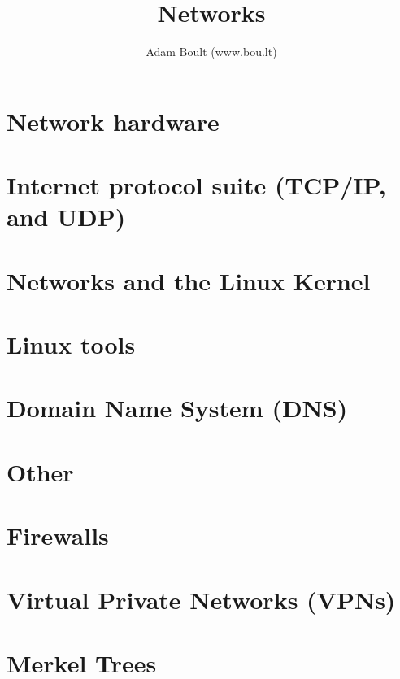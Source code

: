 \documentclass[oneside]{book}
\begin{document}
\author{Adam Boult (www.bou.lt)}
\title{Networks}
\maketitle

\setcounter{tocdepth}{0}
\tableofcontents



\part{Network hardware}

\part{Internet protocol suite (TCP/IP, and UDP)}


\part{Networks and the Linux Kernel}

\part{Linux tools}






\part{Domain Name System (DNS)}




\part{Other}






\part{Firewalls}


\part{Virtual Private Networks (VPNs)}


\part{Merkel Trees}

\end{document}
